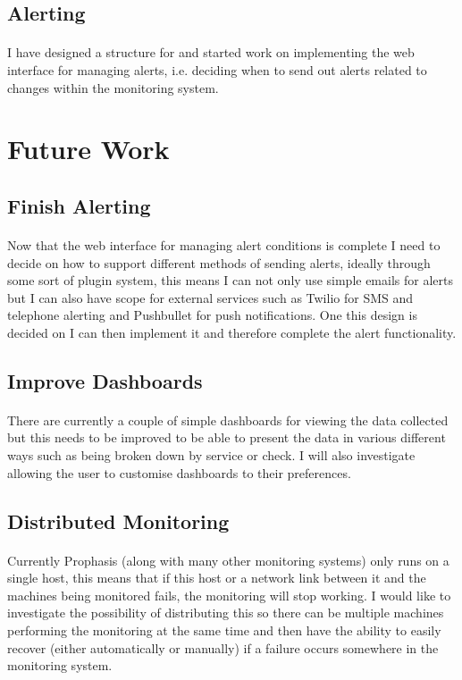 \documentclass[bsc,logo,twoside]{infthesis}
\begin{document}
\subsection{Alerting}
\paragraph*{}
	I have designed a structure for and started work on implementing the web
	interface for managing alerts, i.e. deciding when to send out alerts related
	to changes within the monitoring system.

\section{Future Work}
\subsection{Finish Alerting}
\paragraph*{}
	Now that the web interface for managing alert conditions is complete I need to
	decide on how to support different methods of sending alerts, ideally through
	some sort of plugin system, this means I can not only use simple emails for
	alerts but I can also have scope for external services such as Twilio for SMS
	and telephone alerting and Pushbullet for push notifications.  One this design
	is decided on I can then implement it and therefore complete the alert
	functionality.

\subsection{Improve Dashboards}
\paragraph*{}
	There are currently a couple of simple dashboards for viewing the data
	collected but this needs to be improved to be able to present the data in
	various different ways such as being broken down by service or check. I will
	also investigate allowing the user to customise dashboards to their
	preferences.

\subsection{Distributed Monitoring}
\paragraph*{}
	Currently Prophasis (along with many other monitoring systems) only runs on a
	single host, this means that if this host or a network link between it and the
	machines being monitored fails, the monitoring will stop working. I would like
	to investigate the possibility of distributing this so there can be multiple
	machines performing the monitoring at the same time and then have the ability
	to easily recover (either automatically or manually) if a failure occurs
	somewhere in the monitoring system.
	
\end{document}
